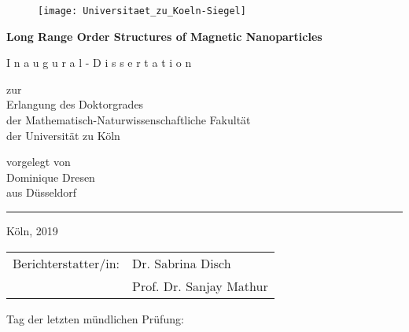 \begin{titlepage}
  \begin{center}
    \begin{figure}[H]
      \centering
      \texttt{[image: Universitaet\_zu\_Koeln-Siegel]}
    \end{figure}
    \LARGE\textbf{Long Range Order Structures of Magnetic Nanoparticles}

    \vspace{2cm}

    \Large{I n a u g u r a l - D i s s e r t a t i o n } \\

    \vspace{2cm}

    \large{zur}\\
    \large{Erlangung des Doktorgrades}\\
    \large{der Mathematisch-Naturwissenschaftliche Fakult\"at}\\
    \large der Universit\"at zu K\"oln\\

    \vspace{2cm}

    \large{vorgelegt von}\\
    \large{Dominique Dresen}\\
    \large{aus D\"usseldorf}\\

    \vspace{2cm}

    \noindent\rule{14cm}{0.4pt}
    \normalsize{Köln, 2019}\\
  \end{center}
\end{titlepage}

\newpage


\vspace{2cm}

\begin{tabular}{@{}ll}
  Berichterstatter/in: & Dr. Sabrina Disch \\
                       & Prof. Dr. Sanjay Mathur
\end{tabular}

\medskip
\vspace{2cm}

Tag der letzten mündlichen Prüfung:



